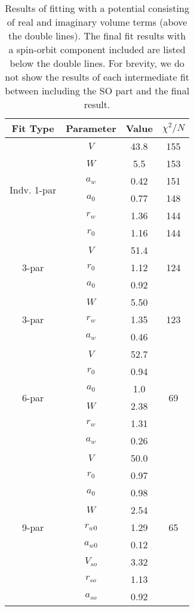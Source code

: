 \documentclass[]{scrartcl}
\begin{document}
\begin{table}
\centering
	\begin{tabular}{ c | c | c | c }
	Fit Type & Parameter & Value & $\chi ^2 / N$\\
\hline
	\multirow{6}{*}{Indv. 1-par} & $V$ & 43.8 & 155 \\
	& $W$ & 5.5 & 153 \\
	& $a _w$ & 0.42 & 151\\
	& $a _0$ & 0.77 & 148\\
	& $r _w$ & 1.36 & 144 \\
	& $r _0$ & 1.16 & 144 \\
\hline
	\multirow{3}{*}{3-par} & $V$ & 51.4 & \multirow{3}{*}{124} \\
	& $r_0$ & 1.12 & \\
	& $a_0$ & 0.92 & \\
\hline
	\multirow{3}{*}{3-par} & $W$ & 5.50 & \multirow{3}{*}{123}\\
	& $r_{w}$ &1.35 & \\
	& $a_w$ & 0.46 & \\
\hline
	\multirow{6}{*}{6-par} & $V$ & 52.7 &  \multirow{6}{*}{69} \\
	& $r_0$ & 0.94  &\\
	& $a_0$ & 1.0  &\\
	& $W$ & 2.38 & \\
	& $r_w$ & 1.31  &\\
	& $a_w$ & 0.26  &\\
\hline
\hline
	\multirow{9}{*}{9-par} & $V$ & 50.0 & \multirow{9}{*}{65}\\
	& $ r_{0} $& 0.97 & \\
	& $ a_{0}$ & 0.98 & \\
	& $W$ & 2.54 & \\
	& $ r _{w0}$ & 1.29 & \\
	& $ a _{w0}$ & 0.12 & \\
	& $ V_{so}$ & 3.32 & \\
	& $ r _{so}$ & 1.13 & \\
	& $ a _{so}$ & 0.92 & \\
\hline
	\end{tabular}
	\caption{Results of fitting with a potential consisting of real and imaginary volume terms (above the double lines). The final fit results with a spin-orbit component included are listed below the double lines. For brevity, we do not show the results of each intermediate fit between including the SO part and the final result.}
	\label{tab:fitvol}
\end{table}
\end{document}
